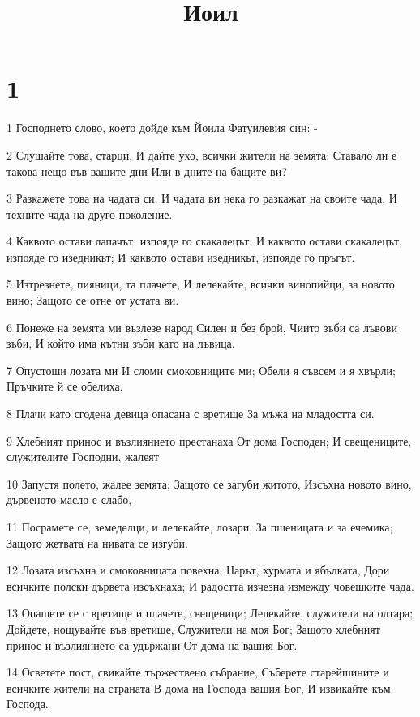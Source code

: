 

\title{Иоил}


\chapter{1}

\par 1 Господнето слово, което дойде към Йоила Фатуилевия син: -
\par 2 Слушайте това, старци, И дайте ухо, всички жители на земята: Ставало ли е такова нещо във вашите дни Или в дните на бащите ви?
\par 3 Разкажете това на чадата си, И чадата ви нека го разкажат на своите чада, И техните чада на друго поколение.
\par 4 Каквото остави лапачът, изпояде го скакалецът; И каквото остави скакалецът, изпояде го изедникьт; И каквото остави изедникьт, изпояде го пръгът.
\par 5 Изтрезнете, пияници, та плачете, И лелекайте, всички винопийци, за новото вино; Защото се отне от устата ви.
\par 6 Понеже на земята ми възлезе народ Силен и без брой, Чиито зъби са лъвови зъби, И който има кътни зъби като на лъвица.
\par 7 Опустоши лозата ми И сломи смоковниците ми; Обели я съвсем и я хвърли; Пръчките й се обелиха.
\par 8 Плачи като сгодена девица опасана с вретище За мъжа на младостта си.
\par 9 Хлебният принос и възлиянието престанаха От дома Господен; И свещениците, служителите Господни, жалеят
\par 10 Запустя полето, жалее земята; Защото се загуби житото, Изсъхна новото вино, дървеното масло е слабо,
\par 11 Посрамете се, земеделци, и лелекайте, лозари, За пшеницата и за ечемика; Защото жетвата на нивата се изгуби.
\par 12 Лозата изсъхна и смоковницата повехна; Нарът, хурмата и ябълката, Дори всичките полски дървета изсъхнаха; И радостта изчезна измежду човешките чада.
\par 13 Опашете се с вретище и плачете, свещеници; Лелекайте, служители на олтара; Дойдете, нощувайте във вретище, Служители на моя Бог; Защото хлебният принос и възлиянието са удържани От дома на вашия Бог.
\par 14 Осветете пост, свикайте тържествено събрание, Съберете старейшините и всичките жители на страната В дома на Господа вашия Бог, И извикайте към Господа.
